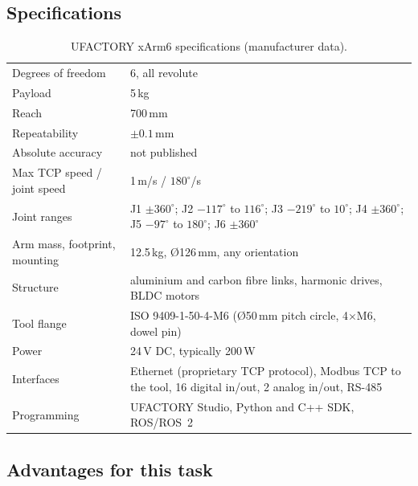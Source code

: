 \documentclass[11pt,a4paper]{article}
\begin{document}
\subsection{Specifications}

\begin{table}[H]
\centering
\caption{UFACTORY xArm6 specifications (manufacturer data).}
\label{tab:xarm}
\begin{tabularx}{\textwidth}{@{}l L@{}}
\toprule
Degrees of freedom & 6, all revolute\\
Payload & 5\,kg\\
Reach & 700\,mm\\
Repeatability & $\pm0.1$\,mm\\
Absolute accuracy & not published\\
Max TCP speed / joint speed & 1\,m/s / $180^\circ$/s\\
Joint ranges & J1 $\pm360^\circ$; J2 $-117^\circ$ to $116^\circ$; J3 $-219^\circ$ to $10^\circ$;
J4 $\pm360^\circ$; J5 $-97^\circ$ to $180^\circ$; J6 $\pm360^\circ$\\
Arm mass, footprint, mounting & 12.5\,kg, \O126\,mm, any orientation\\
Structure & aluminium and carbon fibre links, harmonic drives, BLDC motors\\
Tool flange & ISO 9409-1-50-4-M6 (\O50\,mm pitch circle, 4$\times$M6, dowel pin)\\
Power & 24\,V DC, typically 200\,W\\
Interfaces & Ethernet (proprietary TCP protocol), Modbus TCP to the tool, 16 digital in/out,
2 analog in/out, RS-485\\
Programming & UFACTORY Studio, Python and C++ SDK, ROS/ROS~2\\
\bottomrule
\end{tabularx}
\end{table}

\subsection{Advantages for this task}
\end{document}
